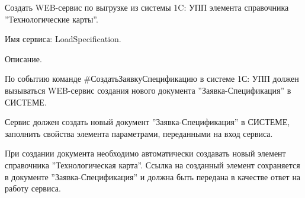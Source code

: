 \label{ex:LoadSpecification}

Создать WEB-сервис по выгрузке из системы 1C: УПП элемента справочника ''Технологические карты''.

Имя сервиса: LoadSpecification.

Описание.

По событию команде \#СоздатьЗаявкуСпецификацию в системе 1С: УПП должен вызываться WEB-сервис создания нового документа ''Заявка-Спецификация'' в СИСТЕМЕ.

Сервис должен создать новый документ ''Заявка-Спецификация'' в СИСТЕМЕ, заполнить свойства элемента параметрами, переданными на вход сервиса.

При создании документа необходимо автоматически создавать новый элемент справочника ''Технологическая карта''. Ссылка на созданный элемент сохраняется в документе ''Заявка-Спецификация'' и должна быть передана в качестве ответ на работу сервиса.

